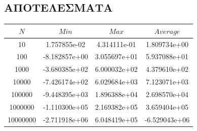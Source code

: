 \documentclass{FR16}
\begin{document}
\subsection{ΑΠΟΤΕΛΕΣΜΑΤΑ}
\begin{center}
\begin{tabular}{c c c c}
\arrayrulecolor{Azzurro}
\hline
{\bfseries $Ν$} & {\bfseries $Min$} & {\bfseries $Max$} & {\bfseries $Average$}\\
\hline
10    & 1.757855e-02 & 4.314111e-01 & 1.809734e+00 \\
100   & -8.182857e+00 & 3.055697e+01 & 5.937088e+01 \\
1000  & -3.680385e+02 & 6.000032e+02 & 4.379610e+02 \\
10000 & -7.426174e+02 & 6.029684e+03 & 7.123071e+03 \\
100000 & -9.448395e+03 & 1.896388e+04 & 2.698570e+04  \\
1000000 & -1.110300e+05 & 2.169382e+05 & 3.659404e+05 \\
10000000 & -2.711918e+06 &  6.048419e+05 & -6.529043e+06 \\
\hline
\end{tabular}
\end{center}
\newpage
\end{document}
